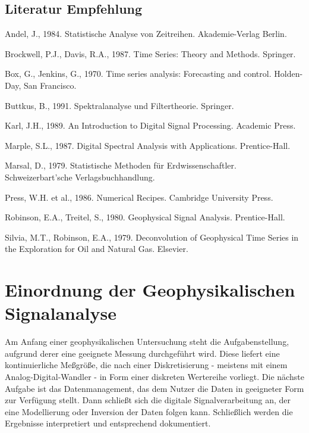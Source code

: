 \subsection{Literatur Empfehlung}

Andel, J., 1984. Statistische Analyse von Zeitreihen. Akademie-Verlag Berlin.

Brockwell, P.J., Davis, R.A., 1987. Time Series: Theory and Methods. Springer.

Box, G.,  Jenkins, G., 1970. Time series analysis: Forecasting and control. Holden-Day, San Francisco.

Buttkus, B., 1991. Spektralanalyse und Filtertheorie. Springer.

Karl, J.H., 1989. An Introduction to Digital Signal Processing. Academic Press.

Marple, S.L., 1987. Digital Spectral Analysis with Applications. Prentice-Hall.

Marsal, D., 1979. Statistische Methoden für Erdwissenschaftler. Schweizerbart’sche Verlagsbuchhandlung.

Press, W.H. et al., 1986. Numerical Recipes. Cambridge University Press.

Robinson, E.A., Treitel, S., 1980. Geophysical Signal Analysis. Prentice-Hall.

Silvia, M.T., Robinson, E.A., 1979. Deconvolution of Geophysical Time Series in the Exploration for Oil and Natural Gas. Elsevier.
  

\vspace{0.3cm}

\section{Einordnung der Geophysikalischen Signalanalyse}
Am Anfang einer geophysikalischen Untersuchung steht die Aufgabenstellung, aufgrund derer eine geeignete Messung durchgeführt wird. Diese liefert eine kontinuierliche Meßgröße, die nach einer Diskretisierung - meistens mit einem Analog-Digital-Wandler - in Form einer diskreten Wertereihe vorliegt. Die nächste Aufgabe ist das Datenmanagement, das dem Nutzer die Daten in geeigneter Form zur Verfügung stellt. Dann schließt sich die digitale Signalverarbeitung an, der eine Modellierung oder Inversion der Daten folgen kann. Schließlich werden die Ergebnisse interpretiert und entsprechend dokumentiert.  

